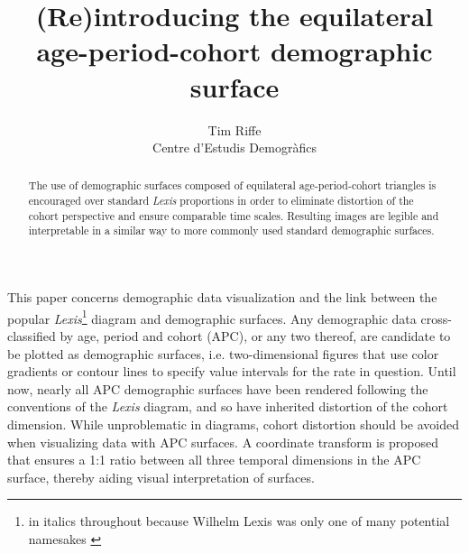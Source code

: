 \documentclass[a4paper]{article}
\begin{document}
\title{(Re)introducing the equilateral age-period-cohort demographic surface}
\author{Tim Riffe \\ Centre d'Estudis Demogr\`{a}fics}
\maketitle

\thispagestyle{empty} %
\pagestyle{empty}

\vspace{2cm}

\begin{abstract}
The use of demographic surfaces composed of equilateral age-period-cohort triangles is encouraged over standard \textit{Lexis} proportions in order to eliminate distortion of the cohort perspective and ensure comparable time scales. Resulting images are legible and interpretable in a similar way to more commonly used standard demographic surfaces.
\end{abstract}

\pagebreak

This paper concerns demographic data visualization and the link between the popular \textit{Lexis}\footnote{in italics throughout because Wilhelm Lexis was only one of many potential namesakes \citep{vandeschrick2001lexis, keiding2011age}} diagram and demographic surfaces. Any demographic data cross-classified by age, period and cohort (APC), or any two thereof, are candidate to be plotted as demographic surfaces, i.e. two-dimensional figures that use color gradients or contour lines to specify value intervals for the rate in question. Until now, nearly all APC demographic surfaces have been rendered following the conventions of the \textit{Lexis} diagram, and so have inherited distortion of the cohort dimension. While unproblematic in diagrams, cohort distortion should be avoided when visualizing data with APC surfaces. A coordinate transform is proposed that ensures a 1:1 ratio between all three temporal dimensions in the APC surface, thereby aiding visual interpretation of surfaces.
\end{document}
